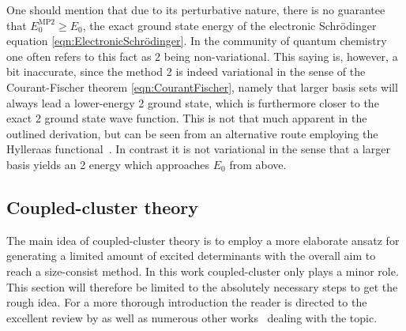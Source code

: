 One should mention that due to its perturbative nature,
there is no guarantee that $E_0^\text{MP2} \geq E_0$,
the exact ground state energy of the electronic Schrödinger equation \eqref{eqn:ElectronicSchrödinger}.
In the community of quantum chemistry one often refers
to this fact as {\MP}2 being non-variational.
This saying is, however, a bit inaccurate,
since the method {\MP}2 is indeed variational
in the sense of the Courant-Fischer theorem \eqref{eqn:CourantFischer},
namely that larger basis sets will always lead a lower-energy {\MP}2 ground state,
which is furthermore closer to the exact {\MP}2 ground state wave function.
This is not that much apparent in the outlined derivation,
but can be seen from an alternative route
employing the Hylleraas functional~\cite{Helgaker2013}.
In contrast it is not variational in the sense that
a larger basis yields an {\MP}2 energy
which approaches $E_0$ from above.

\subsection{Coupled-cluster theory}
\defineabbr{CC}{CC\xspace}{Coupled cluster}
\label{sec:CC}

The main idea of coupled-cluster theory
is to employ a more elaborate ansatz for generating a limited amount
of excited determinants with the overall aim to
reach a size-consist method.
In this work coupled-cluster only plays a minor role.
This section will therefore be limited to the absolutely necessary
steps to get the rough idea.
For a more thorough introduction the reader is directed
to the excellent review by \citet{Crawford2007}
as well as numerous other works~\cite{Helgaker2013,Hodecker2016}
dealing with the topic.

